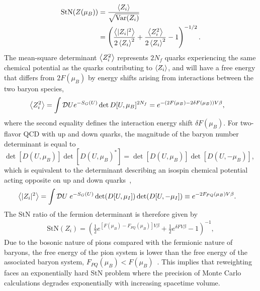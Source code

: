 \begin{equation}
  \begin{split}
    \text{StN}(Z(\mu_B)) &= \frac{\left< Z_i \right>}{\sqrt{\text{Var}(Z_i)}}\\
    &= \left( \frac{\left< |Z_i|^2 \right>}{2\left< Z_i \right>^2} + \frac{\left< Z_i^2 \right>}{2\left< Z_i \right>^2} - 1 \right)^{-1/2}.
  \end{split}\label{eq:ZStN}
\end{equation}
The mean-square determinant $\left< Z_i^2 \right>$ represents $2N_f$ quarks experiencing the same chemical potential as the quarks contributing to $\left< Z_i \right>$, and will have a free energy that differs from $2F(\mu_B)$ by energy shifts arising from interactions between the two baryon species,
\begin{equation}
  \begin{split}
    \left< Z_i^2 \right> &= \int \mathcal{D}U e^{-S_G(U)} \det{D[U,\mu_B]^{2N_f}} =  e^{-\left(2F(\mu_B) - 2\delta F(\mu_B)\right)V\beta},
  \end{split}\label{eq:deltaFdef}
\end{equation}
where the second equality defines the interaction energy shift $\delta F(\mu_B)$.
For two-flavor QCD with up and down quarks, the magnitude of the baryon number determinant is equal to $\det[D(U,\mu_B)]\det[D(U,\mu_B)^*] = \det[D(U,\mu_B)]\det[D(U,-\mu_B)]$, which is equivalent to the determinant describing an isospin chemical potential acting opposite on up and down quarks~\cite{Son:2000xc},
\begin{equation}
  \begin{split}
    \left< |Z_i|^2 \right> &= \int \mathcal{D}U\;e^{-S_G(U)} \det(D[U,\mu_I])\det(D[U,-\mu_I]) \equiv e^{-2F_{PQ}(\mu_B)V\beta}.
  \end{split}\label{eq:FPQdef}
\end{equation}
The StN ratio of the fermion determinant is therefore given by
\begin{equation}
  \begin{split}
    \text{StN}(Z_i) = \left( \frac{1}{2}e^{[F(\mu_B)-F_{PQ}(\mu_B)]V\beta} + \frac{1}{2}e^{\delta F V \beta} - 1 \right)^{-1},
  \end{split}\label{eq:ZStNexp}
\end{equation}
Due to the bosonic nature of pions compared with the fermionic nature of baryons, the free energy of the pion system is lower than the free energy of the associated baryon system, $F_{PQ}(\mu_B) < F(\mu_B)$~\cite{Cohen:2003ut}.
This implies that reweighting faces an exponentially hard StN problem where the precision of Monte Carlo calculations degrades exponentially with increasing spacetime volume.

